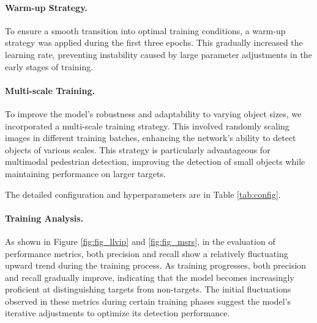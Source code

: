 \paragraph{Warm-up Strategy.} To ensure a smooth transition into optimal training conditions, a warm-up strategy was applied during the first three epochs. This gradually increased the learning rate, preventing instability caused by large parameter adjustments in the early stages of training.
	
\paragraph{Multi-scale Training.} To improve the model's robustness and adaptability to varying object sizes, we incorporated a multi-scale training strategy. This involved randomly scaling images in different training batches, enhancing the network's ability to detect objects of various scales. This strategy is particularly advantageous for multimodal pedestrian detection, improving the detection of small objects while maintaining performance on larger targets.


The detailed configuration and hyperparameters are in Table \ref{tab:config}.


\begin{table}[h]
  \centering
{}
\caption{\textbf{Pedestrian detection training hyperparameters.} Comparison of hyperparameters used in traditional YOLO variants and our approach.}
\label{tab:config}
\end{table}


\paragraph{Training Analysis.}
As shown in Figure \ref{fig:fig_llvip} and \ref{fig:fig_msrs}, in the evaluation of performance metrics, both precision and recall show a relatively fluctuating upward trend during the training process. As training progresses, both precision and recall gradually improve, indicating that the model becomes increasingly proficient at distinguishing targets from non-targets. The initial fluctuations observed in these metrics during certain training phases suggest the model's iterative adjustments to optimize its detection performance.

